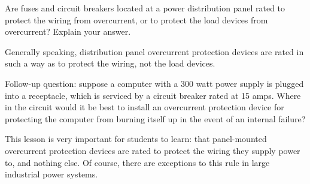 

Are fuses and circuit breakers located at a power distribution panel rated to protect the wiring from overcurrent, or to protect the load devices from overcurrent?  Explain your answer.







Generally speaking, distribution panel overcurrent protection devices are rated in such a way as to protect the wiring, not the load devices.

\vskip 10pt

Follow-up question: suppose a computer with a 300 watt power supply is plugged into a receptacle, which is serviced by a circuit breaker rated at 15 amps.  Where in the circuit would it be best to install an overcurrent protection device for protecting the computer from burning itself up in the event of an internal failure?







This lesson is very important for students to learn: that panel-mounted overcurrent protection devices are rated to protect the wiring they supply power to, and nothing else.  Of course, there are exceptions to this rule in large industrial power systems.




